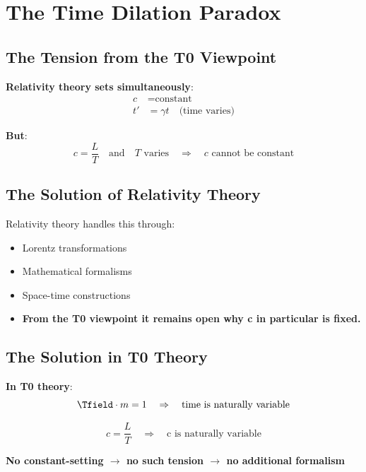	\section{The Time Dilation Paradox}
	
	\subsection{The Tension from the T0 Viewpoint}
	
	\textbf{Relativity theory sets simultaneously}:
	\begin{align}
		c &= \text{constant} \\
		t' &= \gamma t \quad \text{(time varies)}
	\end{align}
	
	\textbf{But}:
	\begin{equation}
		c = \frac{L}{T} \quad \text{and} \quad T \text{ varies} \quad \Rightarrow \quad c \text{ cannot be constant}
	\end{equation}
	
	\subsection{The Solution of Relativity Theory}
	
	Relativity theory handles this through:
	\begin{itemize}
		\item Lorentz transformations
		\item Mathematical formalisms
		\item Space-time constructions
		\item \textbf{From the T0 viewpoint it remains open why c in particular is fixed.}
	\end{itemize}
	
	\subsection{The Solution in T0 Theory}
	
	\textbf{In T0 theory}:
	\begin{equation}
		\Tfield \cdot m = 1 \quad \Rightarrow \quad \text{time is naturally variable}
	\end{equation}
	
	\begin{equation}
		c = \frac{L}{T} \quad \Rightarrow \quad \text{c is naturally variable}
	\end{equation}
	
	\textbf{No constant-setting $\rightarrow$ no such tension $\rightarrow$ no additional formalism}
	
